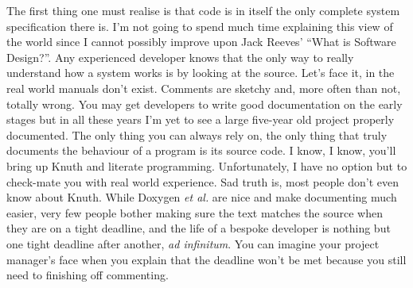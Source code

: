 \documentclass{book}
\begin{document}
The first thing one must realise is that code is in itself the only
complete system specification there is. I'm not going to spend much
time explaining this view of the world since I cannot possibly improve
upon Jack Reeves' ``What is Software Design?''. Any experienced
developer knows that the only way to really understand how a system
works is by looking at the source. Let's face it, in the real world
manuals don't exist. Comments are sketchy and, more often than not,
totally wrong. You may get developers to write good documentation on
the early stages but in all these years I'm yet to see a large
five-year old project properly documented. The only thing you can
always rely on, the only thing that truly documents the behaviour of a
program is its source code. I know, I know, you'll bring up Knuth and
literate programming. Unfortunately, I have no option but to
check-mate you with real world experience. Sad truth is, most people
don't even know about Knuth. While Doxygen \emph{et al.} are nice and
make documenting much easier, very few people bother making sure the
text matches the source when they are on a tight deadline, and the
life of a bespoke developer is nothing but one tight deadline after
another, \emph{ad infinitum}. You can imagine your project manager's
face when you explain that the deadline won't be met because you still
need to finishing off commenting.
\end{document}
